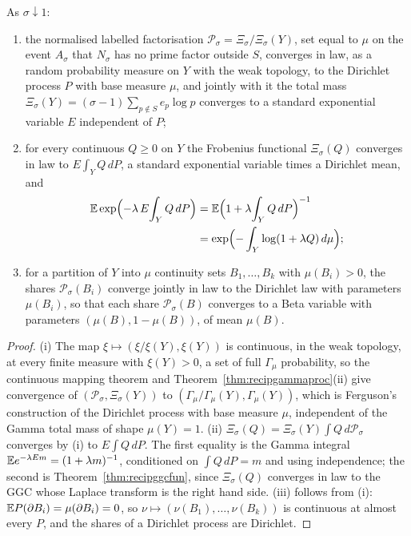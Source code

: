 \begin{theorem}\label{thm:pddirichlet}
As $\sigma\downarrow1$:
\begin{enumerate}
\item[(i)] the normalised labelled factorisation $\mathcal P_\sigma=\Xi_\sigma/\Xi_\sigma(Y)$, set equal to $\mu$ on the event $A_\sigma$ that $N_\sigma$ has no prime factor outside $S$, converges in law, as a random probability measure on $Y$ with the weak topology, to the Dirichlet process $P$ with base measure $\mu$, and jointly with it the total mass $\Xi_\sigma(Y)=(\sigma-1)\sum_{p\notin S}e_p\log p$ converges to a standard exponential variable $E$ independent of $P$;
\item[(ii)] for every continuous $Q\ge0$ on $Y$ the Frobenius functional $\Xi_\sigma(Q)$ converges in law to $E\int_YQ\,dP$, a standard exponential variable times a Dirichlet mean, and
\begin{align*}
\mathbb{E}\exp\Bigl(-\lambda\,E\!\int_YQ\,dP\Bigr)&=\mathbb{E}\Bigl(1+\lambda\!\int_YQ\,dP\Bigr)^{-1}\\
&=\exp\Bigl(-\int_Y\log(1+\lambda Q)\,d\mu\Bigr);
\end{align*}
\item[(iii)] for a partition of $Y$ into $\mu$ continuity sets $B_1,\dots,B_k$ with $\mu(B_i)>0$, the shares $\mathcal P_\sigma(B_i)$ converge jointly in law to the Dirichlet law with parameters $\mu(B_i)$, so that each share $\mathcal P_\sigma(B)$ converges to a Beta variable with parameters $(\mu(B),1-\mu(B))$, of mean $\mu(B)$.
\end{enumerate}
\end{theorem}

\begin{proof}
(i) The map $\xi\mapsto(\xi/\xi(Y),\xi(Y))$ is continuous, in the weak topology, at every finite measure with $\xi(Y)>0$, a set of full $\Gamma_\mu$ probability, so the continuous mapping theorem and Theorem~\ref{thm:recipgammaproc}(ii) give convergence of $(\mathcal P_\sigma,\Xi_\sigma(Y))$ to $(\Gamma_\mu/\Gamma_\mu(Y),\Gamma_\mu(Y))$, which is Ferguson's construction of the Dirichlet process with base measure $\mu$, independent of the Gamma total mass of shape $\mu(Y)=1$. (ii) $\Xi_\sigma(Q)=\Xi_\sigma(Y)\int Q\,d\mathcal P_\sigma$ converges by (i) to $E\int Q\,dP$. The first equality is the Gamma integral $\mathbb{E} e^{-\lambda Em}=(1+\lambda m)^{-1}$, conditioned on $\int Q\,dP=m$ and using independence; the second is Theorem~\ref{thm:recipggcfun}, since $\Xi_\sigma(Q)$ converges in law to the GGC whose Laplace transform is the right hand side. (iii) follows from (i): $\mathbb{E} P(\partial B_i)=\mu(\partial B_i)=0$, so $\nu\mapsto(\nu(B_1),\dots,\nu(B_k))$ is continuous at almost every $P$, and the shares of a Dirichlet process are Dirichlet.
\end{proof}

